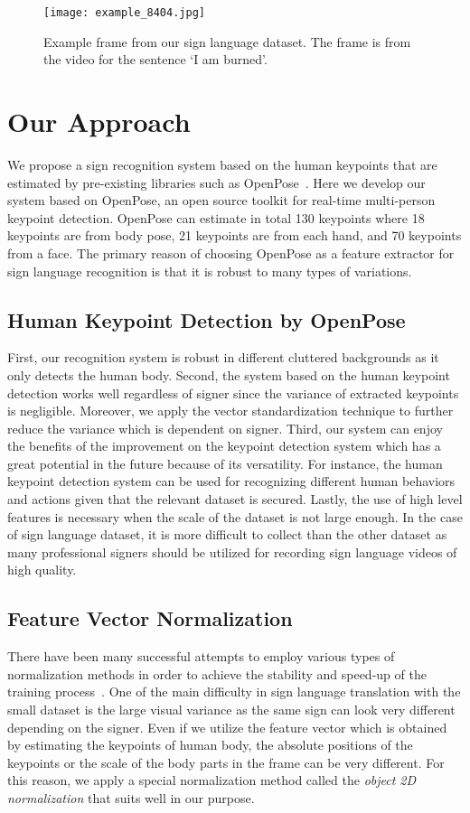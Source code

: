 \documentclass[10pt,twocolumn,letterpaper]{article}
\begin{document}
\begin{figure}[htb]\label{fig:example_frame}
\centering
\texttt{[image: example\_8404.jpg]}
\caption{Example frame from our sign language dataset. The frame is from the video for the sentence `I am burned'.}
\end{figure}


\section{Our Approach}
We propose a sign recognition system based on the human keypoints that are estimated by pre-existing libraries such as OpenPose~\cite{CaoSWS17,SimonJMS17,WeiRKS16}. Here we develop our system based on OpenPose, an open source toolkit for real-time multi-person keypoint detection. OpenPose can estimate in total 130 keypoints where 18 keypoints are from body pose, 21 keypoints are from each hand, and 70 keypoints from a face. The primary reason of choosing OpenPose as a feature extractor for sign language recognition is that it is robust to many types of variations.

\subsection{Human Keypoint Detection by OpenPose}

First, our recognition system is robust in different cluttered backgrounds as it only detects the human body. Second, the system based on the human keypoint detection works well regardless of signer since the variance of extracted keypoints is negligible. Moreover, we apply the vector standardization technique to further reduce the variance which is dependent on signer. Third, our system can enjoy the benefits of the improvement on the keypoint detection system which has a great potential in the future because of its versatility. For instance, the human keypoint detection system can be used for recognizing different human behaviors and actions given that the relevant dataset is secured. Lastly, the use of high level features is necessary when the scale of the dataset is not large enough. In the case of sign language dataset, it is more difficult to collect than the other dataset as many professional signers should be utilized for recording sign language videos of high quality.

\subsection{Feature Vector Normalization}
There have been many successful attempts to employ various types of normalization methods in order to achieve the stability and speed-up of the training process~\cite{BaKH16,IoffeS15,UlyanovVL16}. One of the main difficulty in sign language translation with the small dataset is the large visual variance as the same sign can look very different depending on the signer. Even if we utilize the feature vector which is obtained by estimating the keypoints of human body, the absolute positions of the keypoints or the scale of the body parts in the frame can be very different.
For this reason, we apply a special normalization method called the {\em object 2D normalization} that suits well in our purpose.
\end{document}
